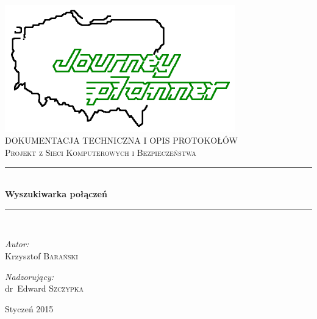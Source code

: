 \documentclass[pdftex,13pt,a4paper]{article}
\newcommand{\HRule}{\rule{\linewidth}{0.5mm}}
\begin{document}
\begin{titlepage}
\begin{center}

\includegraphics[width=0.75\textwidth]{../logo.png}~\\[2cm]


\textsc{\LARGE DOKUMENTACJA TECHNICZNA I OPIS PROTOKOŁÓW}\\[1.5cm]

\textsc{\Large Projekt z Sieci Komputerowych i Bezpieczeństwa}\\[0.5cm]

\HRule \\[0.4cm]
{ \huge \bfseries Wyszukiwarka połączeń \\[0.4cm] }

\HRule \\[1.5cm]

\begin{minipage}{0.4\textwidth}
\begin{flushleft} \large
\emph{Autor:}\\
Krzysztof \textsc{Barański}
\end{flushleft}
\end{minipage}
\begin{minipage}{0.4\textwidth}
\begin{flushright} \large
\emph{Nadzorujący:} \\
dr~Edward \textsc{Szczypka}
\end{flushright}
\end{minipage}

\vfill

{\large Styczeń 2015}

\end{center}
\end{titlepage}

\tableofcontents
\end{document}
